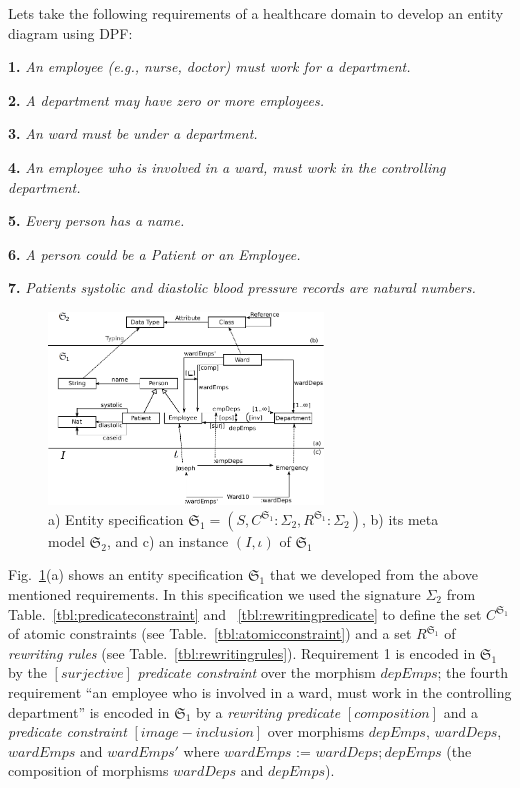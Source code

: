 \documentclass{eceasst}
\begin{document}
Lets take the following requirements of a healthcare domain to develop an entity diagram using DPF:


\textbf{1.} \textit{An employee (e.g., nurse, doctor) must work for a department. }

\textbf{2.} \textit{A department may have zero or more employees. }

\textbf{3.} \textit{An ward must be under a department. }

\textbf{4.} \textit{An employee who is involved in a ward, must work in the controlling department. }

\textbf{5.} \textit{Every person has a name. }

\textbf{6.} \textit{A person could be a Patient or an Employee. }

\textbf{7.} \textit{Patients systolic and diastolic blood pressure records are natural numbers. }






\begin{figure}[h]
\centering
 \includegraphics[width=0.65\textwidth]{entity-1.pdf}
 \caption{ a) Entity specification $\mathfrak{S}_1 = (S, C^{\mathfrak{S}_1} : \Sigma_2 , R^{\mathfrak{S}_1} : \Sigma_2)$, b) its meta model $\mathfrak{S}_2$, and c) an instance $(I,\iota)$ of $\mathfrak{S}_1$}
 \label{fig:entity-diagram}
 \end{figure}

Fig.~\ref{fig:entity-diagram}(a) shows an entity specification $\mathfrak{S}_1$ that we developed from the above mentioned requirements. 
In this specification we used the signature $\Sigma_2$ from Table.~\ref{tbl:predicateconstraint} and ~\ref{tbl:rewritingpredicate} to define the set $C^{\mathfrak{S}_1}$ of atomic constraints 
(see Table.~\ref{tbl:atomicconstraint}) and a set $R^{\mathfrak{S}_1}$ of \textit{rewriting rules} (see Table.~\ref{tbl:rewritingrules}). 
Requirement 1 is encoded in $\mathfrak{S}_1$ by the $[surjective]$ \textit{predicate constraint} over the morphism $depEmps$; 
the fourth requirement ``an employee who is involved in a ward, must work in the controlling department'' is encoded in $\mathfrak{S}_1$ by a \textit{rewriting predicate} $[composition]$ 
and a \textit{predicate constraint} $[image-inclusion]$ over morphisms $depEmps$, $wardDeps$, $wardEmps$ and $wardEmps'$ where $wardEmps$ := $wardDeps; depEmps$ 
(the composition of morphisms $wardDeps$ and $depEmps$).
\end{document}

